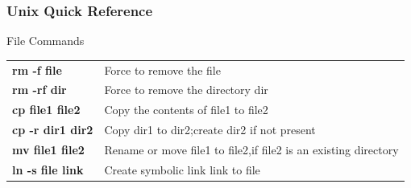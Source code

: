 \documentclass[10pt, hyperref={unicode=true,pdfusetitle, bookmarks=true,bookmarksnumbered=false,bookmarksopen=false, breaklinks=false,pdfborder={0 0 1},backref=true,colorlinks=true,linkcolor=darkblue,pageanchor}]{beamer}
\begin{document}
\begin{frame}
\frametitle{Unix Quick Reference}
\begin{block}{File Commands}

\begin{tabular}{ll}
\textbf{rm -f file}      & Force to remove the file                                              \tabularnewline
\textbf{rm -rf dir}      & Force to remove the directory dir                                     \tabularnewline
\textbf{cp file1 file2}  & Copy the contents of file1 to file2                                   \tabularnewline
\textbf{cp -r dir1 dir2} & Copy dir1 to dir2;create dir2 if not present                          \tabularnewline
\textbf{mv file1 file2}  & Rename or move file1 to file2,if file2 is an existing directory       \tabularnewline
\textbf{ln -s file link} & Create symbolic link link to file                                     \tabularnewline
\end{tabular}

\end{block}
\end{frame}
\end{document}
